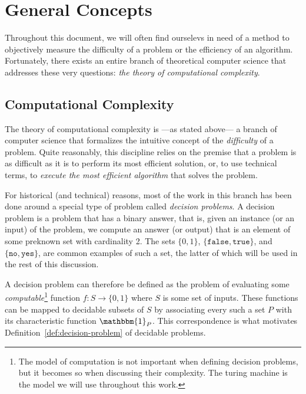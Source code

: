 \chapter{General Concepts}


Throughout this document, we will often find ourselevs in need of a method to objectively measure the difficulty of a problem or the efficiency of an algorithm. Fortunately, there exists an entire branch of theoretical computer science that addresses these very questions: \emph{the theory of computational complexity}.
\section{Computational Complexity}

    The theory of computational complexity is ---as stated above--- a branch of computer science that formalizes the intuitive concept of the \emph{difficulty} of a problem. Quite reasonably, this discipline relies on the premise that a problem is as difficult as it is to perform its most efficient solution, or, to use technical terms, to \emph{execute the most efficient algorithm} that solves the problem.

    For historical (and technical) reasons, most of the work in this branch has been done around a special type of problem called \emph{decision problems}. A decision problem is a problem that has a binary answer, that is, given an instance (or an input) of the problem, we compute an answer (or output) that is an element of some preknown set with cardinality 2. The sets \(\{0, 1\}\), \(\{\texttt{false}, \texttt{true}\}\), and \(\{\texttt{no}, \texttt{yes}\}\), are common examples of such a set, the latter of which will be used in the rest of this discussion.

    A decision problem can therefore be defined as the problem of evaluating some \emph{computable}\footnote{The model of computation is not important when defining decision problems, but it becomes so when discussing their complexity. The turing machine is the model we will use throughout this work.} function \(f: S \rightarrow \{0, 1\}\) where \(S\) is some set of inputs.
    These functions can be mapped to decidable subsets of \(S\) by associating every such a set \(P\) with its characteristic function \(\mathbbm{1}_P\). This correspondence is what motivates Definition~\ref{def:decision-problem} of decidable problems.

